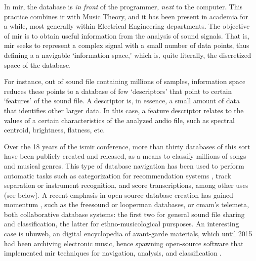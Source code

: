 
In \gls{mir}, the database is \textit{in front} of the programmer, \textit{next} to the computer. This practice combines \gls{ir} with Music Theory, and it has been present in academia for a while, most generally within Electrical Engineering departments. The objective of \gls{mir} is to obtain useful information from the analysis of sound signals. That is, \gls{mir} seeks to represent a complex signal with a small number of data points, thus defining a a navigable `information space,' which is, quite literally, the discretized space of the database.


For instance, out of sound file containing millions of samples, information space reduces these points to a database of few `descriptors' that point to certain `features' of the sound file. A descriptor is, in essence, a small amount of data that identifies other larger data. In this case, a feature descriptor relates to the values of a certain characteristics of the analyzed audio file, such as spectral centroid, brightness, flatness, etc. 

Over the 18 years of the \gls{ismir} conference, more than thirty databases of this sort have been publicly created and released, as a means to classify millions of songs and musical genres. This type of database navigation has been used to perform automatic tasks such as categorization for recommendation systems \parencite{DBLP:journals/corr/abs-0812-4235, asmita_poddar_2018_1422565}, track separation or instrument recognition, and score transcriptions, among other uses (see below). A recent emphasis in open source database creation has gained momentum \parencite{DBLP:conf/ismir/FonsecaPFFBFOPS17}, such as the \gls{freesound} or \gls{looperman} databases, or \gls{cmam}'s \gls{telemeta}, both collaborative database systems: the first two for general sound file sharing and classification, the latter for ethno-musicological pursposes. An interesting case is \gls{ubuweb}, an digital encyclopedia of avant-garde materials, which until 2015 had been archiving electronic music, hence spawning open-source software that implemented \gls{mir} techniques for navigation, analysis, and classification \parencite{collins_2015}.

